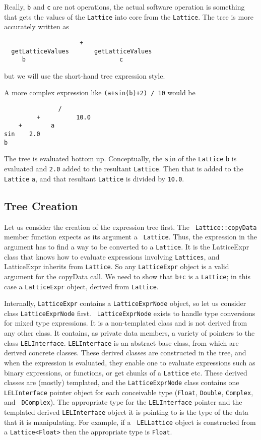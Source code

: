 Really, {\tt b} and {\tt c} are not operations, the actual software
operation is something that gets the values of the {\tt Lattice} into core
from the {\tt Lattice}.  The tree is more accurately written as

\begin{verbatim}
                     +
  getLatticeValues       getLatticeValues
     b                          c
\end{verbatim}

but we will use the short-hand tree expression style.

A more complex expression like  {\tt (a+sin(b)+2) / 10}
would be

\begin{verbatim}
               / 
         +          10.0
    +        a
sin    2.0
b
\end{verbatim}

The tree is evaluated bottom up.  Conceptually, the {\tt sin} of the {\tt Lattice}
{\tt b} is evaluated and {\tt 2.0} added to the resultant {\tt Lattice}.  Then that
is added to the {\tt Lattice} {\tt a}, and that resultant {\tt Lattice} is divided
by {\tt 10.0}.




\subsection {Tree Creation}

Let us consider the creation of the expression tree first.  The {\tt
Lattice::copyData} member function expects as its argument a {\tt
Lattice}.  Thus, the expression in the argument has to find a way to be
converted to a {\tt Lattice}.  It is the LatticeExpr class that knows
how to evaluate expressions involving {\tt Lattices}, and LatticeExpr
inherits from {\tt Lattice}.  So any {\tt LatticeExpr} object is a valid
argument for the copyData call.  We need to show that {\tt b+c} is a
{\tt Lattice}; in this case a {\tt LatticeExpr} object, derived from
{\tt Lattice}. 

Internally, {\tt LatticeExpr} contains a {\tt LatticeExprNode} object,
so let us consider class {\tt LatticeExprNode} first.  {\tt
LatticeExprNode} exists to handle type conversions for mixed type
expressions.  It is a non-templated class and is not derived from any
other class.  It contains, as private data members, a variety of
pointers to the class {\tt LELInterface}.  {\tt LELInterface} is an
abstract base class, from which are derived concrete classes.  These
derived classes are constructed in the tree, and when the expression is
evaluated, they enable one to evaluate expressions such as binary
expressions, or functions, or get chunks of a {\tt Lattice} etc.  These
derived classes are (mostly) templated, and the {\tt LatticeExprNode}
class contains one {\tt LELInterface} pointer object for each
conceivable type ({\tt Float}, {\tt Double}, {\tt Complex}, and {\tt
DComplex}).  The appropriate type for the {\tt LELInterface} pointer and
the templated derived {\tt LELInterface} object it is pointing to is the
type of the data that it is manipulating.  For example, if a {\tt
LELLattice} object is constructed from a {\tt Lattice<Float>} then the
appropriate type is {\tt Float}. 

